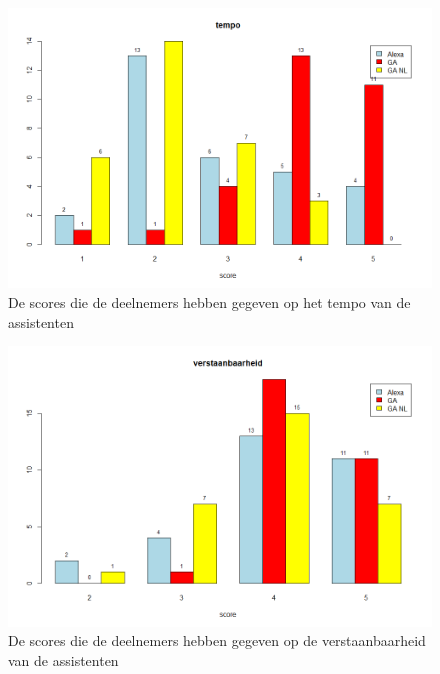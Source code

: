 \begin{figure}[H]
    \centering
    \includegraphics[width=0.9\linewidth]{../onderzoek/onderzoeksresultaten/vergelijking_assistenten_per_eigenschap/barplot/barplot_score_tempo}
    \caption{De scores die de deelnemers hebben gegeven op het tempo van de assistenten}
    \label{fig:barplot-tempo}
\end{figure}

\begin{figure}[H]
    \centering
    \includegraphics[width=0.9\linewidth]{../onderzoek/onderzoeksresultaten/vergelijking_assistenten_per_eigenschap/barplot/barplot_score_verstaanbaarheid}
    \caption{De scores die de deelnemers hebben gegeven op de verstaanbaarheid van de assistenten}
    \label{fig:barplot-verstaanbaarheid}
\end{figure}

